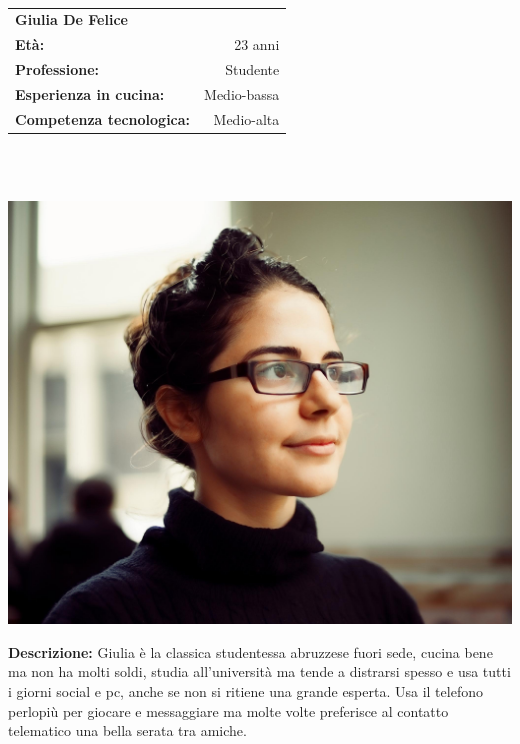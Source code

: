 \hrulefill\\
\begin{minipage}{.75\textwidth}
\begin{tabular}{l | r}
	\textbf{Giulia De Felice} & \\
	\textbf{Età:} & 23 anni\\
	\textbf{Professione:} & Studente\\
	\textbf{Esperienza in cucina:} & Medio-bassa\\
	\textbf{Competenza tecnologica:} & Medio-alta\\
\end{tabular}\\\\
\end{minipage}
\begin{minipage}{.24\textwidth}
	\includegraphics[width=\textwidth]{img/personas/giulia}
\end{minipage}
	\textbf{Descrizione:}  Giulia è la classica studentessa abruzzese fuori
	sede, cucina bene ma non ha molti soldi, studia all'università ma tende
	a distrarsi spesso e usa tutti i giorni social e pc, anche se non si
	ritiene una grande esperta.  Usa il telefono perlopiù per giocare e
	messaggiare ma molte volte preferisce al contatto telematico una bella
	serata tra amiche.\\

